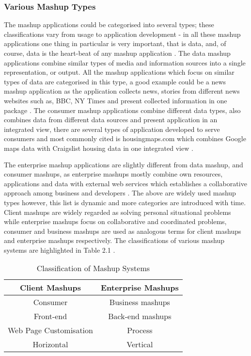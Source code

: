 \subsubsection{Various Mashup Types}

The mashup applications could be categorised into several types; these classifications vary from usage to application development - in all these mashup applications one thing in particular is very important, that is data, and, of course, data is the heart-beat of any mashup application \cite{zhao2011mashup}. The data mashup applications combine similar types of media and information sources into a single representation, or output. All the mashup applications which focus on similar types of data are categorised in this type, a good example could be a news mashup application as the application collects news, stories from different news websites such as, BBC, NY Times and present collected information in one package \cite{li2013customized}. The consumer mashup applications combine different data types, also combines data from different data sources and present application in an integrated view, there are several types of application developed to serve consumers and most commonly cited is housingmaps.com which combines Google maps data with Craigslist housing data in one integrated view \cite{zhao2011mashup}. 

The enterprise mashup applications are slightly different from data mashup, and consumer mashups, as enterprise mashups mostly combine own resources, applications and data with external web services which establishes a collaborative approach among business and developers \cite{liu2011composing}. The above are widely used mashup types however, this list is dynamic and more categories are introduced with time. Client mashups are widely regarded as solving personal situational problems while enterprise mashups focus on collaborative and coordinated problems, consumer and business mashups are used as analogous terms for client mashups and enterprise mashups respectively. The classifications of various mashup systems are highlighted in Table 2.1 \cite{11}.

\begin{table}[h!]
\centering
 \begin{tabular}{||c | c ||} 
 \hline
 \textbf{Client Mashups} & \textbf{Enterprise Mashups}  \\ [0.5ex] 
 \hline\hline
Consumer  & 	Business mashups\\
Front-end  &	Back-end mashups\\
Web Page Customisation &	Process \\
Horizontal  & 	Vertical \\ [1ex] 
 \hline
 \end{tabular}
 \caption{Classification of Mashup Systems}

\end{table}

